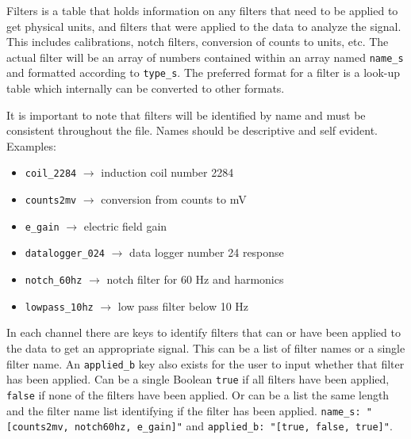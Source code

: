 \documentclass{article}
\begin{document}
Filters is a table that holds information on any filters that need to be applied to get physical units, and filters that were applied to the data to analyze the signal.  This includes calibrations, notch filters, conversion of counts to units, etc. The actual filter will be an array of numbers contained within an array named \verb|name_s| and formatted according to \verb|type_s|. The preferred format for a filter is a look-up table which internally can be converted to other formats. 

It is important to note that filters will be identified by name and must be consistent throughout the file. Names should be descriptive and self evident. Examples:
\begin{itemize}
	\item \verb|coil_2284| $\longrightarrow$ induction coil number 2284
	\item \verb|counts2mv| $\longrightarrow$ conversion from counts to mV
	\item \verb|e_gain| $\longrightarrow$ electric field gain 
	\item \verb|datalogger_024| $\longrightarrow$ data logger number 24 response
	\item \verb|notch_60hz| $\longrightarrow$ notch filter for 60 Hz and harmonics
	\item \verb|lowpass_10hz| $\longrightarrow$ low pass filter below 10 Hz
\end{itemize}

In each channel there are keys to identify filters that can or have been applied to the data to get an appropriate signal.  This can be a list of filter names or a single filter name.  An \verb|applied_b| key also exists for the user to input whether that filter has been applied.  Can be a single Boolean \verb|true| if all filters have been applied, \verb|false| if none of the filters have been applied.  Or can be a list the same length and the filter name list identifying if the filter has been applied.  \verb|name_s: "[counts2mv, notch60hz, e_gain]"| and \verb|applied_b: "[true, false, true]"|. 
\end{document}
